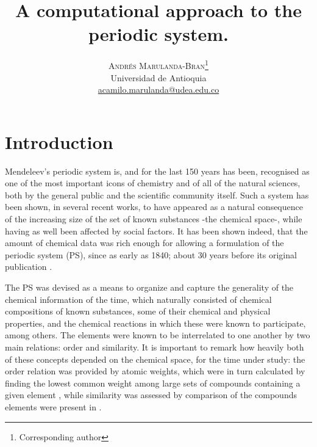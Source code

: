 \documentclass[]{article}
\begin{document}
\title{A computational approach to the periodic system.}

\author{%
\textsc{Andr\'es Marulanda-Bran}\thanks{Corresponding author} \\[1ex]
\normalsize Universidad de Antioquia \\ %
\normalsize \href{mailto:correoAndres}{acamilo.marulanda@udea.edu.co} %
}


\maketitle


\section{Introduction}
\label{sec:intro}

Mendeleev's periodic system is, and for the last 150 years has been, recognised as one of the most important icons of chemistry and of all of the natural sciences, both by the general public and the scientific community itself. Such a system has been shown, in several recent works, to have appeared as a natural consequence of the increasing size of the set of known substances -the chemical space-, while having as well been affected by social factors. It has been shown indeed, that the amount of chemical data was rich enough for allowing a formulation of the periodic system (PS), since as early as 1840; about 30 years before its original publication \cite{ChemSpacePSArose}.

The PS was devised as a means to organize and capture the generality of the chemical information of the time, which naturally consisted of chemical compositions of known substances, some of their chemical and physical properties, and the chemical reactions in which these were known to participate, among others. The elements were known to be interrelated to one another by two main relations: order and similarity. It is important to remark how heavily both of these concepts depended on the chemical space, for the time under study: the order relation was provided by atomic weights, which were in turn calculated by finding the lowest common weight among large sets of compounds containing a given element \cite{Hargittai:pf0063}, while similarity was assessed by comparison of the compounds elements were present in \cite{mendeleevSelectWritings}.
\end{document}

